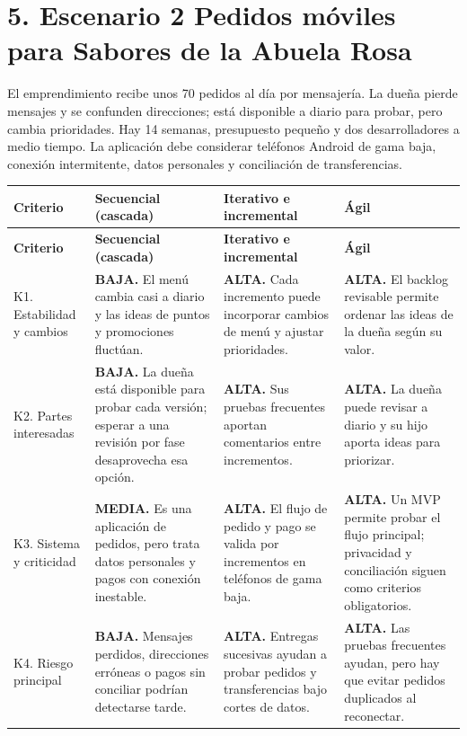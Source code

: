\documentclass[10pt,letterpaper]{article}
\newcommand{\separa}{\hspace{0.25em}\raisebox{0.25ex}{\rule{0.38ex}{0.38ex}}\hspace{0.25em}}
\newcommand{\titulo}[1]{\section*{\textcolor{verde}{#1}}}
\begin{document}
\par
\titulo{5. Escenario 2 \separa Pedidos móviles para Sabores de la Abuela Rosa}
\par
El emprendimiento recibe unos 70 pedidos al día por mensajería. La dueña pierde mensajes y se confunden direcciones; está disponible a diario para probar, pero cambia prioridades. Hay 14 semanas, presupuesto pequeño y dos desarrolladores a medio tiempo. La aplicación debe considerar teléfonos Android de gama baja, conexión intermitente, datos personales y conciliación de transferencias.
\par
\scriptsize
\par
\begin{longtable}{@{}p{3.15cm}p{7.15cm}p{7.15cm}p{7.15cm}@{}}
\rowcolor{verde}\color{white}\textbf{Criterio}&\color{white}\textbf{Secuencial (cascada)}&\color{white}\textbf{Iterativo e incremental}&\color{white}\textbf{Ágil}\\\endfirsthead
\rowcolor{verde}\color{white}\textbf{Criterio}&\color{white}\textbf{Secuencial (cascada)}&\color{white}\textbf{Iterativo e incremental}&\color{white}\textbf{Ágil}\\\endhead
K1. Estabilidad y cambios&\textbf{BAJA.} El menú cambia casi a diario y las ideas de puntos y promociones fluctúan.&\textbf{ALTA.} Cada incremento puede incorporar cambios de menú y ajustar prioridades.&\textbf{ALTA.} El backlog revisable permite ordenar las ideas de la dueña según su valor.\\\hline
K2. Partes interesadas&\textbf{BAJA.} La dueña está disponible para probar cada versión; esperar a una revisión por fase desaprovecha esa opción.&\textbf{ALTA.} Sus pruebas frecuentes aportan comentarios entre incrementos.&\textbf{ALTA.} La dueña puede revisar a diario y su hijo aporta ideas para priorizar.\\\hline
K3. Sistema y criticidad&\textbf{MEDIA.} Es una aplicación de pedidos, pero trata datos personales y pagos con conexión inestable.&\textbf{ALTA.} El flujo de pedido y pago se valida por incrementos en teléfonos de gama baja.&\textbf{ALTA.} Un MVP permite probar el flujo principal; privacidad y conciliación siguen como criterios obligatorios.\\\hline
K4. Riesgo principal&\textbf{BAJA.} Mensajes perdidos, direcciones erróneas o pagos sin conciliar podrían detectarse tarde.&\textbf{ALTA.} Entregas sucesivas ayudan a probar pedidos y transferencias bajo cortes de datos.&\textbf{ALTA.} Las pruebas frecuentes ayudan, pero hay que evitar pedidos duplicados al reconectar.\\\hline

\end{longtable}
\end{document}

